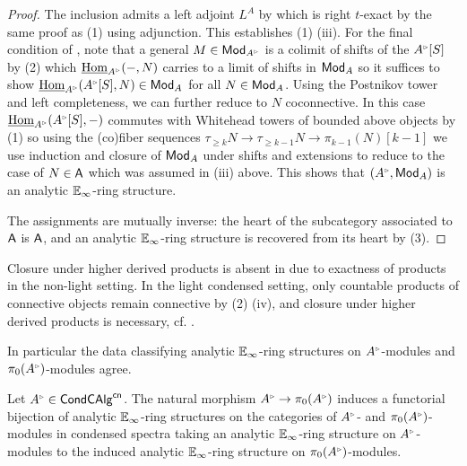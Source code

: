 \begin{proof}
    The inclusion admits a left adjoint $L^{A}$ by \cite[Thm. 1.1]{RagimovReflection} which is right $t$-exact by the same proof as  (1) using adjunction. This establishes  (1) (iii). For the final condition of , note that a general $M\in\Mod_{A^{\tri}}$ is a colimit of shifts of the $A^{\tri}[S]$ by  (2) which $\intHom_{A^{\tri}}(-,N)$ carries to a limit of shifts in $\mathsf{Mod}_{A}$ so it suffices to show $\intHom_{A^{\tri}}(A^{\tri}[S],N)\in\Mod_{A}$ for all $N\in\mathsf{Mod}_{A}$. Using the Postnikov tower and left completeness, we can further reduce to $N$ coconnective. In this case $\intHom_{A^{\tri}}(A^{\tri}[S],-)$ commutes with Whitehead towers of bounded above objects by  (1) so using the (co)fiber sequences $\tau_{\geq k}N\to\tau_{\geq k-1}N\to\pi_{k-1}(N)[k-1]$ we use induction and closure of $\mathsf{Mod}_{A}$ under shifts and extensions to reduce to the case of $N\in\mathsf{A}$ which was assumed in (iii) above. This shows that $(A^{\tri},\Mod_{A})$ is an analytic $\mathbb{E}_{\infty}$-ring structure. 

    The assignments are mutually inverse: the heart of the subcategory associated to $\mathsf{A}$ is $\mathsf{A}$, and an analytic $\mathbb{E}_{\infty}$-ring structure is recovered from its heart by  (3). 
\end{proof}
\begin{remark}\label{rmk: higher derived products}
    Closure under higher derived products is absent in \cite[Prop. 12.19]{Analytic} due to exactness of products in the non-light setting. In the light condensed setting, only countable products of connective objects remain connective by  (2) (iv), and closure under higher derived products is necessary, cf. \cite[Rmk. 4.4.3]{CamargoSolid}. 
\end{remark}
In particular the data classifying analytic $\mathbb{E}_{\infty}$-ring structures on $A^{\tri}$-modules and $\pi_{0}(A^{\tri})$-modules agree. 
\begin{proposition}\label{prop: functorial heart invariance}
    Let $A^{\tri}\in\Cond\CAlg^{\cn}$. The natural morphism $A^{\tri}\to\pi_{0}(A^{\tri})$ induces a functorial bijection of analytic $\mathbb{E}_{\infty}$-ring structures on the categories of $A^{\tri}$- and $\pi_{0}(A^{\tri})$-modules in condensed spectra taking an analytic $\mathbb{E}_{\infty}$-ring structure on $A^{\tri}$-modules to the induced analytic $\mathbb{E}_{\infty}$-ring structure on $\pi_{0}(A^{\tri})$-modules. 
\end{proposition}

